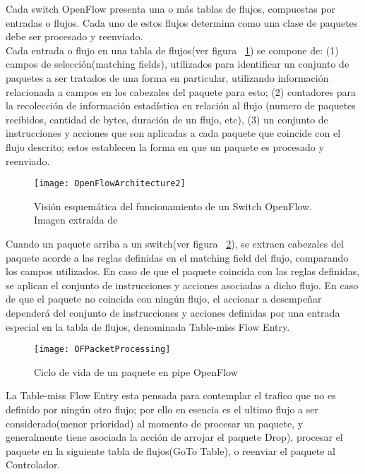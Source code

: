 Cada switch OpenFlow presenta una o m\'as tablas de flujos, compuestas por entradas o flujos. Cada uno de estos flujos determina como una clase de paquetes debe ser procesado y reenviado.\\

Cada entrada o flujo en una tabla de flujos(ver figura ~\ref{fig:OpenFlowArch2}) se compone de: (1) campos de selección(matching fields), utilizados para identificar un conjunto de paquetes a ser tratados de una forma en particular, utilizando información relacionada a campos en los cabezales del paquete para esto; (2) contadores para la recolección de información estadística en relación al flujo (numero de paquetes recibidos, cantidad de bytes, duración de un flujo, etc), (3) un conjunto de instrucciones y acciones que son aplicadas a cada paquete que coincide con el flujo descrito; estos establecen la forma en que un paquete es procesado y reenviado.
 
\begin{figure}[htbp!] 
\centering    
\texttt{[image: OpenFlowArchitecture2]}
\caption[Visión esquemática del funcionamiento de un Switch OpenFlow]{Visión esquemática del funcionamiento de un Switch OpenFlow. Imagen extraída de \cite{mckeown2008openflow}}
\label{fig:OpenFlowArch2}
\end{figure}

Cuando un paquete arriba a un switch(ver figura ~\ref{fig:OFPacketProcessing}), se extraen cabezales del paquete acorde a las reglas definidas en el matching field del flujo, comparando los campos utilizados. En caso de que el paquete coincida con las reglas definidas, se aplican el conjunto de instrucciones y acciones asociadas a dicho flujo. En caso de que el paquete no coincida con ningún flujo, el accionar a desempeñar dependerá del conjunto de instrucciones y acciones definidas por una entrada especial en la tabla de flujos, denominada Table-miss Flow Entry.\\ 

\begin{figure}[htbp!] 
\centering    
\texttt{[image: OFPacketProcessing]}
\caption[Ciclo de vida de un paquete en pipe OpenFlow]{Ciclo de vida de un paquete en pipe OpenFlow}
\label{fig:OFPacketProcessing}
\end{figure}


La Table-miss Flow Entry esta pensada para contemplar el trafico que no es definido por ningún otro flujo; por ello en esencia es el ultimo flujo a ser considerado(menor prioridad) al momento de procesar un paquete, y generalmente tiene asociada la acción de arrojar el paquete Drop), procesar el paquete en la siguiente tabla de flujos(GoTo Table), o reenviar el paquete al Controlador.\\


